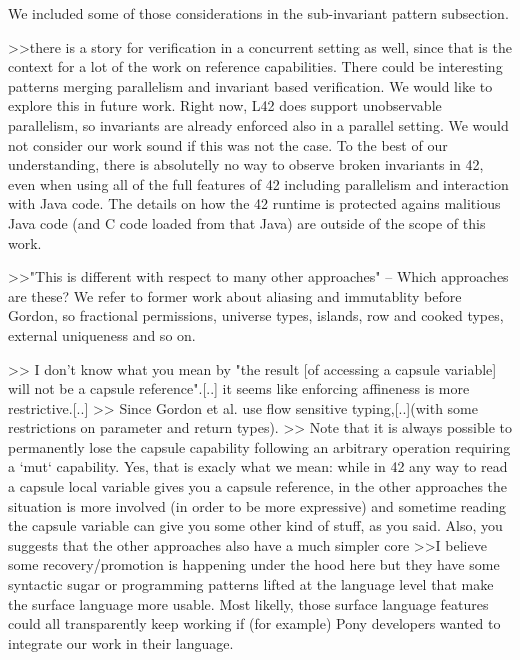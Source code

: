 We included some of those considerations in the sub-invariant pattern subsection.


>>there is a story for verification in a concurrent setting as well, since that is  the context for a lot of the work on reference capabilities.
There could be interesting patterns merging parallelism and invariant based verification. We would like to explore this in future work.
Right now, L42 does support unobservable parallelism, so invariants are already enforced also in a parallel setting.
We would not consider our work sound if this was not the case. To the best of our understanding, there is absolutelly no way 
to observe broken invariants in 42, even when using all of the full features of 42 including parallelism and interaction with Java code.
The details on how the 42 runtime is protected agains malitious Java code (and C code loaded from that Java) are outside of the scope of this work.



>>"This is different with respect to many other approaches"  -- Which approaches are these? 
We refer to former work about aliasing and immutablity before Gordon, so fractional permissions, universe types, islands, row and cooked types, external uniqueness and so on.


>> I don't know what you mean by "the result [of accessing a capsule variable] will not be a capsule reference".[..] it seems like enforcing affineness is more restrictive.[..]
>>  Since Gordon et al. use flow sensitive typing,[..](with some restrictions on parameter and return types).
>>  Note that it is always possible to permanently lose the capsule  capability following an arbitrary operation requiring a `mut` capability.
Yes, that is exacly what we mean: while in 42 any way to read a capsule local variable gives you a capsule reference, in the other approaches the situation is more involved
 (in order to be more expressive) and sometime reading the capsule variable can give you some other kind of stuff, as you said.
Also, you suggests that the other approaches also have a much simpler core 
>>I believe some recovery/promotion is happening under the hood here
but they have some syntactic sugar or programming patterns lifted at the language level that make the surface language more usable.
Most likelly, those surface language features could all transparently keep working if (for example) Pony developers wanted to integrate our work in their language.


